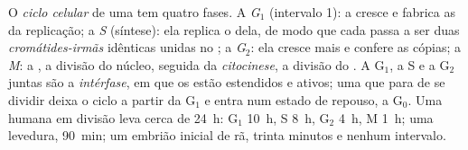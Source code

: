 \begin{definition}\label{def:b1:replication-mitosis:cycle}
O \emph{ciclo celular} de uma  tem quatro fases. A
\emph{G$_1$} (intervalo 1): a  cresce e fabrica as  da
replicação; a \emph{S} (síntese): ela replica o  dela, de modo que
cada  passa a ser duas \emph{cromátides-irmãs} idênticas
unidas no ; a \emph{G$_2$}: ela cresce mais e confere as
cópias; a \emph{M}: a \emph{}, a divisão do núcleo, seguida da
\emph{citocinese}, a divisão do . A G$_1$, a S e a G$_2$
juntas são a \emph{intérfase}, em que os  estão estendidos e
ativos; uma  que para de se dividir deixa o ciclo a partir da
G$_1$ e entra num estado de repouso, a G$_0$. Uma  humana em
divisão leva cerca de \qty{24}{h}: G$_1$ \qty{10}{h}, S \qty{8}{h},
G$_2$ \qty{4}{h}, M \qty{1}{h}; uma levedura, \qty{90}{min}; um embrião
inicial de rã, trinta minutos e nenhum intervalo.
\end{definition}

